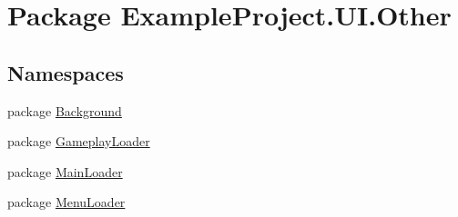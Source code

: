 \hypertarget{namespace_example_project_1_1_u_i_1_1_other}{}\section{Package Example\+Project.\+U\+I.\+Other}
\label{namespace_example_project_1_1_u_i_1_1_other}
\subsection*{Namespaces}
\begin{DoxyCompactItemize}
\item 
package \hyperlink{namespace_example_project_1_1_u_i_1_1_other_1_1_background}{Background}
\item 
package \hyperlink{namespace_example_project_1_1_u_i_1_1_other_1_1_gameplay_loader}{Gameplay\+Loader}
\item 
package \hyperlink{namespace_example_project_1_1_u_i_1_1_other_1_1_main_loader}{Main\+Loader}
\item 
package \hyperlink{namespace_example_project_1_1_u_i_1_1_other_1_1_menu_loader}{Menu\+Loader}
\end{DoxyCompactItemize}
